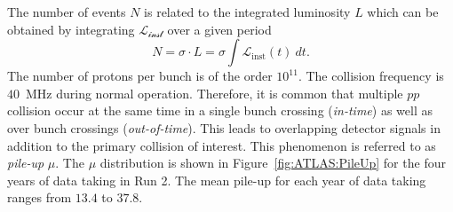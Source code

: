 The number of events $N$ is related to the integrated luminosity $L$ which can be obtained by integrating $\mathcal{L_\text{inst}}$ over a given period
\begin{equation}
    N = \sigma \cdot L = \sigma \int \mathcal{L}_\text{inst}(t)~dt.
\end{equation}
The number of protons per bunch is of the order $10^{11}$. 
The collision frequency is $40$~MHz during normal operation.
Therefore, it is common that multiple $pp$ collision occur at the same time in a single bunch crossing (\textit{in-time}) as well as over bunch crossings (\textit{out-of-time}).
This leads to overlapping detector signals in addition to the primary collision of interest. This phenomenon is referred to as \textit{pile-up} $\mu$. 
The $\mu$ distribution is shown in Figure~\ref{fig:ATLAS:PileUp} for the four years of data taking in Run 2. 
The mean pile-up for each year of data taking ranges from $13.4$ to $37.8$.
